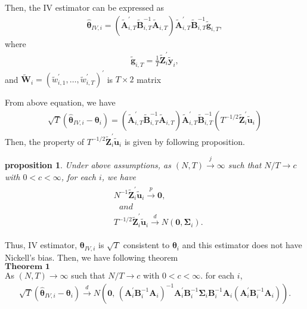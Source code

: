 \documentclass[12pt,a4paper,hyperref]{article}
\newtheorem{myProp}{proposition}
\begin{document}
Then, the IV estimator can be expressed as
\begin{align}
\boldsymbol{\hat{\theta}}_{IV,i}=\left(\tilde{\boldsymbol{A}}_{i,T}^{'}\tilde{\boldsymbol{B}}_{i,T}^{-1}\tilde{\boldsymbol{A}}_{i,T} \right)\tilde{\boldsymbol{A}}_{i,T}^{'}\tilde{\boldsymbol{B}}_{i,T}^{-1}\tilde{\boldsymbol{g}}_{i,T},
\end{align}
where
\begin{align}
\tilde{\boldsymbol{g}}_{i,T}=\frac{1}{T}\tilde{\boldsymbol{Z}}^{'}_{i}\tilde{\boldsymbol{y}}_{i},
\end{align}
 and $\tilde{\boldsymbol{W}}_{i}=\left( \tilde{w}^{'}_{i,1},\ldots, \tilde{w}^{'}_{i,T} \right)^{'}$ is $T \times 2$ matrix

From above equation, we have
\begin{align}
\sqrt{T}\left(\boldsymbol{\hat{\theta}}_{IV,i}-\boldsymbol{\theta}_{i} \right)=\left(\tilde{\boldsymbol{A}}_{i,T}^{'}\tilde{\boldsymbol{B}}_{i,T}^{-1}\tilde{\boldsymbol{A}}_{i,T} \right)\tilde{\boldsymbol{A}}_{i,T}^{'}\tilde{\boldsymbol{B}}_{i,T}^{-1}\left(T^{-1/2}  \tilde{\boldsymbol{Z}}^{'}_{i}\tilde{\boldsymbol{u}}_{i} \right)
\end{align}
Then, the property of $T^{-1/2}  \tilde{\boldsymbol{Z}}^{'}_{i}\tilde{\boldsymbol{u}}_{i} $ is given by following proposition.\\
\begin{myProp}
Under above assumptions, as $\left(N, T \right)\overset{j}{\to} \infty$ such that $N/T \to c$ with $0 < c<\infty $, for each $i$, we have
\begin{align}
\begin{split}
&N^{-1} \tilde{\boldsymbol{Z}}^{'}_{i}\tilde{\boldsymbol{u}}_{i}\overset{p}{\to} \boldsymbol{0},  \\
&\,\,\,\,and\,\,\,\,\, \\
&T^{-1/2}  \tilde{\boldsymbol{Z}}^{'}_{i}\tilde{\boldsymbol{u}}_{i} \overset{d}{\to} N\left(\boldsymbol{0},\boldsymbol{\Sigma}_{i} \right).
\end{split}
\end{align}
\end{myProp}

Thus, IV  estimator, $\boldsymbol{\theta}_{IV, i}$ is $\sqrt{T}$ consistent to $\boldsymbol{\theta}_{i}$ and this estimator does not have Nickell's bias. Then, we have following theorem\\
$\mathbf{Theorem \,\,1}$ \\
As $\left(N,T \right)\to \infty $ such that $N/T \to c$ with $0< c< \infty$. for each $i$,
\begin{align}
\sqrt{T}\left(\hat{\boldsymbol{\theta}}_{IV,i}-\boldsymbol{\theta}_{i}  \right)\overset{d}{\to} N \left(\boldsymbol{0},\,\left(\boldsymbol{A}_{i}^{'}\boldsymbol{B}_{i}^{-1}\boldsymbol{A}_{i} \right)^{-1}\boldsymbol{A}_{i}^{'}\boldsymbol{B}_{i}^{-1}   \boldsymbol{\Sigma}_{i}\boldsymbol{B}_{i}^{-1} \boldsymbol{A}_{i}\left(\boldsymbol{A}_{i}^{'}\boldsymbol{B}_{i}^{-1}\boldsymbol{A}_{i} \right)\right).
\end{align}
\end{document}
